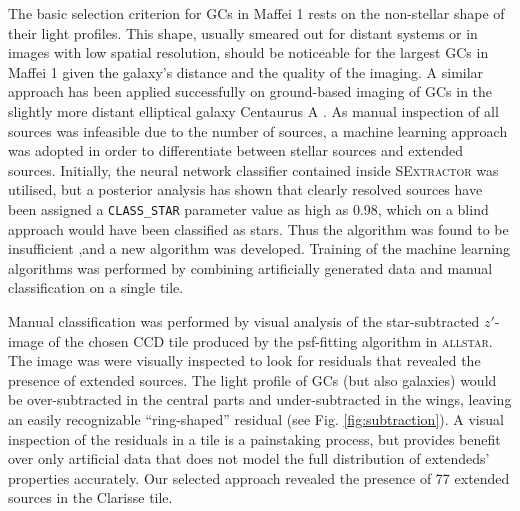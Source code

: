 \documentclass[useAMS,usenatbib]{mn2e}
\begin{document}
The basic selection criterion for GCs in Maffei 1 rests on the
non-stellar shape of their light profiles. This shape, usually smeared
out for distant systems or in images with low spatial resolution,
should be noticeable for the largest GCs in Maffei 1 given the
galaxy's distance and the quality of the imaging. A similar approach
has been applied successfully on ground-based imaging of GCs in the
slightly more distant elliptical galaxy Centaurus A
\citep{rejkuba01,gomez06,gomez07}. As manual inspection of all sources was infeasible
due to the number of sources, a machine learning approach was adopted in order
to differentiate between stellar sources and extended sources. Initially, the neural network
classifier contained inside \textsc{SExtractor} was utilised, but a posterior analysis has shown that clearly resolved sources have been assigned a \verb+CLASS_STAR+ parameter value as high
as 0.98, which on a blind approach would have been classified as
stars. Thus the algorithm was found to be insufficient ,and a new algorithm was developed. Training of the machine learning algorithms was performed by combining artificially generated data and manual classification on a single tile.

Manual classification was performed by visual analysis of the star-subtracted $z'$-image of the chosen CCD tile produced by the psf-fitting algorithm in
\textsc{allstar}. The image was were visually inspected to look for residuals that
revealed the presence of extended sources. The light profile of GCs
(but also galaxies) would be over-subtracted in the central parts and
under-subtracted in the wings, leaving an easily recognizable
``ring-shaped'' residual (see Fig. \ref{fig:subtraction}). A visual
inspection of the residuals in a tile is a
painstaking process, but provides benefit over only artificial data that does not model the full distribution of extendeds' properties accurately. Our selected approach revealed the presence of 77 extended sources in the Clarisse tile.
\end{document}
